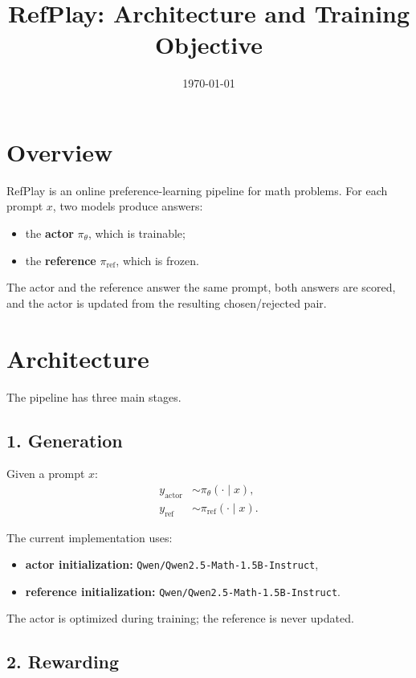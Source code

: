 \documentclass[11pt]{article}
\title{RefPlay: Architecture and Training Objective}
\author{}
\date{\today}
\begin{document}
\maketitle

\section{Overview}

RefPlay is an online preference-learning pipeline for math problems.
For each prompt $x$, two models produce answers:
\begin{itemize}
  \item the \textbf{actor} $\pi_{\theta}$, which is trainable;
  \item the \textbf{reference} $\pi_{\mathrm{ref}}$, which is frozen.
\end{itemize}

The actor and the reference answer the same prompt, both answers are scored,
and the actor is updated from the resulting chosen/rejected pair.

\section{Architecture}

The pipeline has three main stages.

\subsection*{1. Generation}

Given a prompt $x$:
\begin{align*}
y_{\mathrm{actor}} &\sim \pi_{\theta}(\cdot \mid x), \\
y_{\mathrm{ref}} &\sim \pi_{\mathrm{ref}}(\cdot \mid x).
\end{align*}

The current implementation uses:
\begin{itemize}
  \item \textbf{actor initialization:} \texttt{Qwen/Qwen2.5-Math-1.5B-Instruct},
  \item \textbf{reference initialization:} \texttt{Qwen/Qwen2.5-Math-1.5B-Instruct}.
\end{itemize}

The actor is optimized during training; the reference is never updated.

\subsection*{2. Rewarding}
\end{document}
